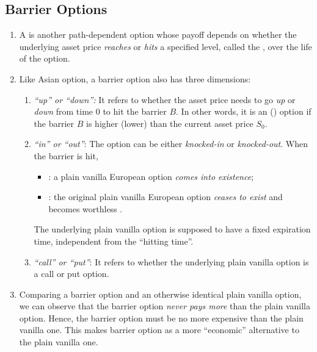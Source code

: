 \subsection{Barrier Options}
\label{subsect:barrier-option}
\begin{enumerate}
\item A  is another path-dependent option whose payoff
depends on whether the underlying asset price \emph{reaches} or \emph{hits} a
specified level, called the , over the life of the option. 

\item Like Asian option, a barrier option also has three dimensions:
\begin{enumerate}[label={(\arabic*)}]
\item \emph{``up'' or ``down'':} It refers to whether the asset price needs to
go \emph{up}  or \emph{down}  from time 0
to hit the barrier \(B\). In other words, it is an  ()
option if the barrier \(B\) is higher (lower) than the current asset price
\(S_0\).
\item \emph{``in'' or ``out''}: The option can be either \emph{knocked-in} or
\emph{knocked-out}. When the barrier is hit,
\begin{itemize}
\item {}: a plain vanilla European option \emph{comes into
existence};
\item {}: the original plain vanilla European option
\emph{ceases to exist} and becomes worthless .
\end{itemize}
\begin{note}
The underlying plain vanilla option is supposed to have a fixed expiration
time, independent from the ``hitting time''.
\end{note}
\item \emph{``call'' or ``put''}: It refers to whether the underlying plain
vanilla option is a call or put option.
\end{enumerate}

\item Comparing a barrier option and an otherwise identical plain vanilla
option, we can observe that the barrier option \emph{never pays more} than the
plain vanilla option. Hence, the barrier option must be no more expensive
than the plain vanilla one. This makes barrier option as a more ``economic''
alternative to the plain vanilla one.


\end{enumerate}

